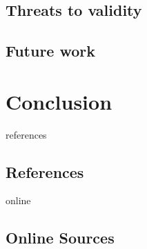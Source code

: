 \documentclass[12pt,a4paper]{report}
\begin{document}
\section{Threats to validity} \label{sect:threats-to-validity}

\section{Future work} \label{sect:future-work}




\chapter{Conclusion} \label{chap:conclusion}






\newpage
{}
\listoffigures
\newpage
{}
\listoftables
\newpage
{}

\begin{btSect}{references}
\section*{\huge{References}}
\btPrintCited
\end{btSect}
\begin{btSect}{online}
\section*{\huge{Online Sources}}
\btPrintCited
\end{btSect}
\end{document}
